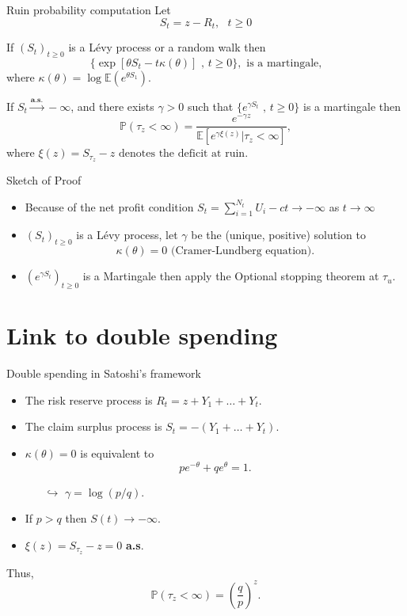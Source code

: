 \documentclass{beamer}
\begin{document}
\begin{frame}{Ruin probability computation}
\scriptsize
Let 
$$
S_t = z - R_t,\text{ }t\geq0
$$
\begin{tcolorbox}[enhanced,drop shadow, title=Theorem (Wald exponential martingale)]
If $(S_t)_{t\geq0}$ is a L\'evy process or a random walk then
$$
\{\exp\left[\theta S_t-t\kappa(\theta)\right]\text{ , }t\geq0\},\text{ is a martingale,}
$$
where $\kappa(\theta)=\log\mathbb{E}\left(e^{\theta S_1}\right)$.
\end{tcolorbox}
\begin{tcolorbox}[enhanced,drop shadow, title=Theorem (Representation of the ruin probability)]

If $S_t\overset{\textbf{a.s.}}{\rightarrow} -\infty$, and there exists $\gamma>0$ such that $\{e^{\gamma S_t}\text{ , }t\geq0\}$ is a martingale then
$$
\mathbb{P}(\tau_z<\infty)=\frac{e^{-\gamma z}}{\mathbb{E}\left[e^{\gamma \xi(z)}|\tau_z<\infty\right]},
$$
where $\xi(z)=S_{\tau_z}-z\text{ denotes the deficit at ruin.}$
\end{tcolorbox}
\end{frame}
\begin{frame}{Sketch of Proof}
\scriptsize
\begin{itemize}
\item Because of the net profit condition $S_t = \sum_{i=1}^{N_t}U_i-ct\rightarrow -\infty$ as $t\rightarrow\infty$
\item $(S_t)_{t\geq0}$ is a Lévy process, let $\gamma$ be the (unique, positive) solution to
$$
\kappa(\theta) = 0\text{ (Cramer-Lundberg equation)}.
$$
\item  $(e^{\gamma S_t})_{t\geq0}$ is a Martingale then apply the Optional stopping theorem at $\tau_u$.

\end{itemize}
\end{frame}
\section{Link to double spending}
\begin{frame}{Double spending in Satoshi's framework}
\scriptsize
\begin{itemize}
\item The risk reserve process is $R_t=z+Y_1+\ldots+Y_t.$
\item The claim surplus process is $S_t=-(Y_1+\ldots+Y_t).$
\item $\kappa(\theta)=0$ is equivalent to
$$pe^{-\theta}+qe^{\theta}=1.$$
\begin{itemize}
\item[$\hookrightarrow$]\scriptsize $\gamma=\log(p/q).$
\end{itemize}
\item If $p>q$ then $S(t)\rightarrow - \infty$.
\item  $\xi(z)=S_{\tau_z}-z=0$ \textbf{a.s}.
\end{itemize}
Thus,
$$\mathbb{P}(\tau_z<\infty)=\left(\frac{q}{p}\right)^{z}.$$
\end{frame}
\end{document}
